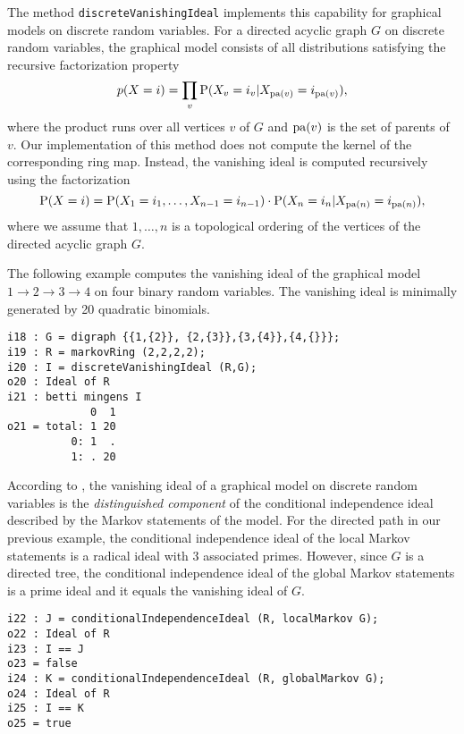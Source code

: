 \documentclass[letterpaper]{article}
\theoremstyle{definition}
\newcommand{\pa}{{\rm pa}}
\begin{document}
The method
{\tt discreteVanishingIdeal} implements this capability for graphical
models on discrete random variables. For a directed acyclic graph $G$ on discrete random variables, the graphical model consists
of all distributions satisfying the recursive factorization
property 
\[p(X = i) = \prod_{v} {\rm P}(X_{v} = i_{v} | X_{\pa(v)} = i_{\pa(v)}),\]
where the product runs over all vertices $v$ of $G$ and $\pa(v)$ is the set of
parents of $v$. 
Our implementation of this method does not compute the kernel of the
corresponding ring map. Instead, the vanishing ideal is
computed recursively using the factorization 
\[{\rm P}(X = i) = {\rm P}(X_{1} = i_{1},\dots, X_{n-1} = i_{n-1})\cdot {\rm P}(X_{n} = i_{n} | X_{\pa(n)} = i_{\pa(n)}),\]
where we assume that $1, \ldots, n$ is a topological ordering of
the vertices of the directed acyclic graph $G$.

The following example computes the vanishing ideal of the graphical model $1\to
2 \to 3\to 4$ on four binary random variables. The vanishing ideal is
minimally generated by 20 quadratic binomials.

\begin{verbatim}
i18 : G = digraph {{1,{2}}, {2,{3}},{3,{4}},{4,{}}};
i19 : R = markovRing (2,2,2,2);
i20 : I = discreteVanishingIdeal (R,G);
o20 : Ideal of R
i21 : betti mingens I
             0  1
o21 = total: 1 20
          0: 1  .
          1: . 20
\end{verbatim}

According to \cite{GSS}, the vanishing ideal of a graphical model on discrete
random variables is the \emph{distinguished
  component} of the conditional independence ideal described by the Markov
statements of the model. For the directed path in our previous example, the
conditional independence ideal of the local Markov statements 
is a radical ideal with 3 associated primes. However, since $G$ is a directed
tree, the conditional independence ideal of the global Markov statements is a
prime ideal and it equals the vanishing ideal of $G$.

 \begin{verbatim}
i22 : J = conditionalIndependenceIdeal (R, localMarkov G);
o22 : Ideal of R
i23 : I == J
o23 = false
i24 : K = conditionalIndependenceIdeal (R, globalMarkov G);
o24 : Ideal of R
i25 : I == K
o25 = true
\end{verbatim}
\end{document}
